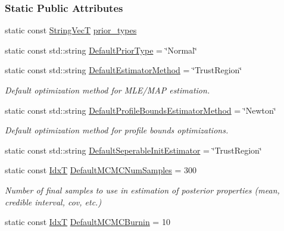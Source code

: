 \subsubsection*{Static Public Attributes}
\begin{DoxyCompactItemize}
\item 
static const \hyperlink{namespacemappel_aae88cf18bccfbb789a6019bcfbbfca68}{String\+VecT} \hyperlink{classmappel_1_1Gauss1DModel_a2f72a3c4729aa81d8ffdd96a60374cd6}{prior\+\_\+types}
\item 
static const std\+::string \hyperlink{classmappel_1_1Gauss1DModel_a4186ce131a5cc9a451ecc0011e4e6682}{Default\+Prior\+Type} = \char`\"{}Normal\char`\"{}
\item 
static const std\+::string \hyperlink{classmappel_1_1PointEmitterModel_aa90f02cfd2af6acf4d8ba3bbfbe906e5}{Default\+Estimator\+Method} = \char`\"{}Trust\+Region\char`\"{}
\begin{DoxyCompactList}\small\item\em Default optimization method for M\+L\+E/\+M\+AP estimation. \end{DoxyCompactList}\item 
static const std\+::string \hyperlink{classmappel_1_1PointEmitterModel_a5240568f2d7c7bad84e900d283b299dc}{Default\+Profile\+Bounds\+Estimator\+Method} = \char`\"{}Newton\char`\"{}
\begin{DoxyCompactList}\small\item\em Default optimization method for profile bounds optimizations. \end{DoxyCompactList}\item 
static const std\+::string \hyperlink{classmappel_1_1PointEmitterModel_ad8c3dc629d75d22f25855a5f1ba8729f}{Default\+Seperable\+Init\+Estimator} = \char`\"{}Trust\+Region\char`\"{}
\item 
static const \hyperlink{namespacemappel_ab17ec0f30b61ece292439d7ece81d3a8}{IdxT} \hyperlink{classmappel_1_1PointEmitterModel_a9bbed2f2e91f1e5f0f4f9389cd2de333}{Default\+M\+C\+M\+C\+Num\+Samples} = 300
\begin{DoxyCompactList}\small\item\em Number of final samples to use in estimation of posterior properties (mean, credible interval, cov, etc.) \end{DoxyCompactList}\item 
static const \hyperlink{namespacemappel_ab17ec0f30b61ece292439d7ece81d3a8}{IdxT} \hyperlink{classmappel_1_1PointEmitterModel_a6fc96e398771a33d5586c2af10a2e6d8}{Default\+M\+C\+M\+C\+Burnin} = 10

\end{DoxyCompactItemize}
